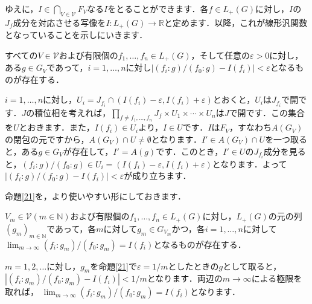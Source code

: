 ゆえに，$I \in \bigcap_{V \in \mathscr{V}}F_V$なる$I$をとることができます．各$f \in L_{+}(G)$に対し，$I$の$J_f$成分を対応させる写像を$I \colon L_{+}(G) \to \mathbb{R}$と定めます．以降，これが線形汎関数となっていることを示しにいきます．
\begin{prop}\label{21}
すべての$V \in \mathscr{V}$および有限個の$f_1, \ldots , f_n \in L_{+}(G)$，そして任意の$\varepsilon > 0$に対し，ある$g \in G_V$であって，$i=1, \ldots , n$に対し$|(f_i \colon g ) / ( f_0 \colon g ) -I(f_i) | < \varepsilon$となるものが存在する．
\end{prop}
\begin{Proof}
$i=1, \ldots , n$に対し，$U_i=J_{f_i} \cap ( I(f_i)- \varepsilon, I(f_i)+\varepsilon )$とおくと，$U_i$は$J_{f_i}$で開です．$J$の積位相を考えれば，$\prod_{f \neq f_1, \ldots , f_n}J_f \times U_1 \times \cdots \times U_n$は$J$で開です．この集合を$U$とおきます．また，$I(f_i) \in U_i$より，$I \in U$です．$I$は$F_V$，すなわち$A(G_V)$の閉包の元ですから，$A(G_V) \cap U \neq \emptyset$となります．$I' \in A(G_V) \cap U$を一つ取ると，ある$g \in G_V$が存在して，$I'=A(g)$です．このとき，$I' \in U$の$J_{f_i}$成分を見ると，$(f_i \colon g ) / ( f_0 \colon g ) \in U_i = ( I(f_i)- \varepsilon, I(f_i)+\varepsilon )$となります．よって$|(f_i \colon g ) / ( f_0 \colon g ) -I(f_i) | < \varepsilon$が成り立ちます．
\end{Proof}
命題\ref{21}を，より使いやすい形にしておきます．

\begin{cor}\label{22}
$V_m \in \mathscr{V}(m \in \mathbb{N})$および有限個の$f_1, \ldots , f_n \in L_{+}(G)$に対し，$L_{+}(G)$の元の列$(g_m)_{m \in \mathbb{N}}$であって，各$m$に対して$g_m \in G_{V_m}$かつ，各$i=1, \ldots , n$に対して $\lim_{m \to \infty} (f_i \colon g_m ) / ( f_0 \colon g_m ) =I(f_i)$となるものが存在する．
\end{cor}
\begin{Proof}
$m=1,2, \ldots$に対し，$g_m$を命題\ref{21}で$\varepsilon = 1/m$としたときの$g$として取ると，$|(f_i \colon g_m ) / ( f_0 \colon g_m ) -I(f_i) | < 1/m$となります．両辺の$m \to \infty$による極限を取れば， $\lim_{m \to \infty} (f_i \colon g_m ) / ( f_0 \colon g_m ) =I(f_i)$となります．　
\end{Proof}

